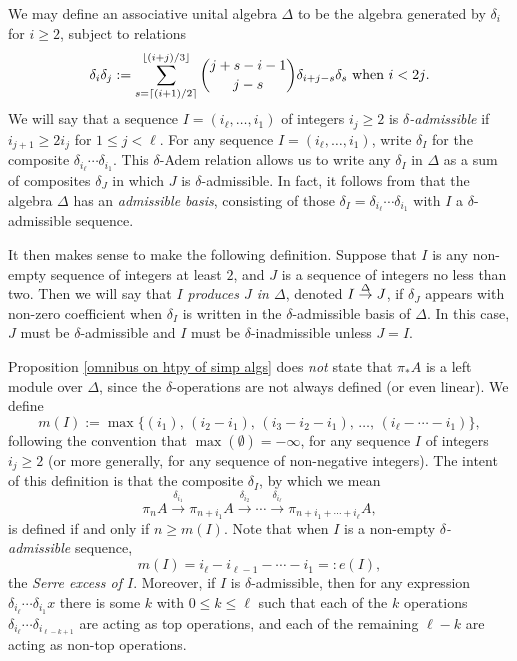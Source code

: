 \documentclass[11pt]{amsart} \renewcommand{\baselinestretch}{1.2}
\theoremstyle{plain}
\numberwithin{equation}{section} %
\theoremstyle{plain}
\numberwithin{equation}{chapter} %
\renewcommand{\to}{\longrightarrow}
\newcommand{\deltaalg}{\Delta} %
\newcommand{\minDimDelta}{m}
\newcommand{\produces}[3]{#3:#1\sim #2}
\renewcommand{\produces}[3]{#1\rightarrow_{#3} #2}%
\renewcommand{\produces}[3]{#1\overset{\smash{#3}}{\rightarrow} #2}%
\begin{document}
\begin{Constructing homotopy operations}
We may define an associative unital algebra $\deltaalg$ to be the algebra generated by $\delta_i$ for $i\geq2$, subject to relations
\[\delta_i\delta_j:=\sum_{s=\lceil(i+1)/2\rceil}^{\lfloor(i+j)/3\rfloor}{j+s-i-1\choose j-s}\delta_{i+j-s}\delta_s\textup{ when $i<2j$}.\]
We will say that a sequence $I=(i_\ell,\ldots,i_1)$ of integers $i_j\geq2$ is \emph{$\delta$-admissible} if $i_{j+1}\geq 2i_j$ for $1\leq j <\ell$. For any sequence $I=(i_\ell,\ldots,i_1)$, write $\delta_I$ for the composite $\delta_{i_\ell}\cdots \delta_{i_1}$. This $\delta$-Adem  relation allows us to write any $\delta_I$ in $\deltaalg$ as a sum of composites $\delta_J$ in which $J$ is $\delta$-admissible. In fact, it follows from \cite[Proposition 2.7]{MR1089001} that the algebra $\deltaalg$ has an \emph{admissible basis}, consisting of those $\delta_I=\delta_{i_\ell}\cdots \delta_{i_{1}}$ with $I$ a $\delta$-admissible sequence. 

It then makes sense to make the following definition. Suppose that $I$ is any non-empty sequence of integers at least $2$, and $J$ is a sequence of integers no less than two. Then we will say that \emph{$I$ produces $J$ in $\deltaalg$}, denoted $\produces{I}{J}{\deltaalg}$, if  $\delta_J$ appears with non-zero coefficient  when $\delta_I$ is written in the $\delta$-admissible basis of $\deltaalg$. In this case, $J$ must be $\delta$-admissible and $I$ must be $\delta$-inadmissible unless $J=I$.

Proposition \ref{omnibus on htpy of simp algs} does \emph{not} state that $\pi_*A$ is a left module over $\deltaalg$, since the $\delta$-operations are not always defined (or even linear). We define
\[\minDimDelta(I):=\max\{(i_1),\,(i_2-i_1),\,(i_3-i_2-i_1),\,\ldots,\,(i_{\ell}-\cdots-i_1)\},
\]
following the convention that $\max(\emptyset)=-\infty$, for any sequence $I$ of integers $i_j\geq2$ (or more generally, for any sequence of non-negative integers).  The intent of this definition is that the composite $\delta_I$, by which we mean
\[\pi_{n}A\overset{\delta_{i_1}}{\to}\pi_{n+i_1}A\overset{\delta_{i_2}}{\to}\cdots \overset{\delta_{i_\ell}}{\to}\pi_{n+i_1+\cdots +i_\ell}A,\]
is defined if and only if $n\geq \minDimDelta(I)$.
Note that when $I$ is a non-empty \emph{$\delta$-admissible} sequence,
\[\minDimDelta(I)=i_{\ell}-i_{\ell-1}-\cdots -i_1=:e(I),\]
the \emph{Serre excess of $I$}. Moreover, if $I$ is $\delta$-admissible, then for any expression $\delta_{i_{\ell}}\cdots \delta_{i_{1}}x$ there is some $k$ with $0\leq k\leq \ell$ such that each of the $k$ operations $\delta_{i_{\ell}}\cdots \delta_{i_{\ell-k+1}}$ are acting as top operations, and each of the remaining $\ell-k$ are acting as non-top operations.


\end{Constructing homotopy operations}
\end{document}
